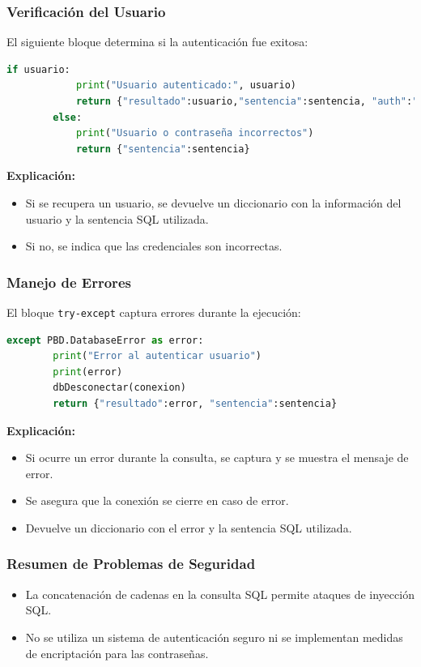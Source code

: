 \documentclass[a4paper,12pt]{article}
\begin{document}
\subsubsection{Verificación del Usuario}
El siguiente bloque determina si la autenticación fue exitosa:

\begin{lstlisting}[language=Python]
        if usuario:
            print("Usuario autenticado:", usuario)
            return {"resultado":usuario,"sentencia":sentencia, "auth":"true"}
        else:
            print("Usuario o contraseña incorrectos")
            return {"sentencia":sentencia}
\end{lstlisting}

\textbf{Explicación:}
\begin{itemize}
    \item Si se recupera un usuario, se devuelve un diccionario con la información del usuario y la sentencia SQL utilizada.
    \item Si no, se indica que las credenciales son incorrectas.
\end{itemize}

\subsubsection{Manejo de Errores}
El bloque \texttt{try-except} captura errores durante la ejecución:

\begin{lstlisting}[language=Python]
    except PBD.DatabaseError as error:
        print("Error al autenticar usuario")
        print(error)
        dbDesconectar(conexion)
        return {"resultado":error, "sentencia":sentencia}
\end{lstlisting}

\textbf{Explicación:}
\begin{itemize}
    \item Si ocurre un error durante la consulta, se captura y se muestra el mensaje de error.
    \item Se asegura que la conexión se cierre en caso de error.
    \item Devuelve un diccionario con el error y la sentencia SQL utilizada.
\end{itemize}

\subsubsection{Resumen de Problemas de Seguridad}
\begin{itemize}
    \item La concatenación de cadenas en la consulta SQL permite ataques de inyección SQL.
    \item No se utiliza un sistema de autenticación seguro ni se implementan medidas de encriptación para las contraseñas.
\end{itemize}
\end{document}
